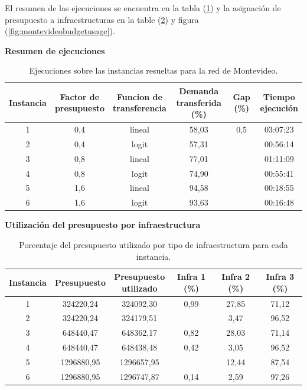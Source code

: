 \documentclass{article}
\begin{document}
  El resumen de las ejecuciones se encuentra en la tabla (\ref{table:montevideoexecutions}) y la asignación de presupuesto a infraestructuras en la table (\ref{table:montevideobudgetusage}) y figura (\ref{fig:montevideobudgetusage}).

  \begin{table}[h!]
    \centering
    \caption*{{\bf Resumen de ejecuciones}}
    \begin{tabular}{cccccc}
      \toprule
        Instancia & \shortstack{Factor de \\ presupuesto} & \shortstack{Funcion de \\ transferencia} & \shortstack{Demanda \\ transferida (\%)} & Gap (\%) & \shortstack{Tiempo \\ ejecución} \\
      \midrule
        1 & 0,4 & lineal & 58,03 & 0,5 & 03:07:23 \\
        2 & 0,4 & logit & 57,31 &  & 00:56:14 \\
        3 & 0,8 & lineal & 77,01 &  & 01:11:09 \\
        4 & 0,8 & logit & 74,90 &  & 00:55:41 \\
        5 & 1,6 & lineal & 94,58 &  & 00:18:55 \\
        6 & 1,6 & logit & 93,63 &  & 00:16:48 \\
      \bottomrule
    \end{tabular}
      \caption{Ejecuciones sobre las instancias resueltas para la red de Montevideo.}\label{table:montevideoexecutions}
  \end{table}

  \begin{table}[h!]
    \centering
    \caption*{{\bf Utilización del presupuesto por infraestructura}}
    \begin{tabular}{cccccc}
      \toprule
        Instancia & Presupuesto & \shortstack{Presupuesto \\ utilizado} & Infra 1 (\%) & Infra 2 (\%) & Infra 3 (\%) \\
      \midrule
        1 & 324220,24 & 324092,30 & 0,99 & 27,85 & 71,12 \\
        2 & 324220,24 & 324179,51 &  & 3,47 & 96,52 \\
        3 & 648440,47 & 648362,17 & 0,82 & 28,03 & 71,14 \\
        4 & 648440,47 & 648438,48 & 0,42 & 3,05 & 96,52 \\
        5 & 1296880,95 & 1296657,95 &  & 12,44 & 87,54 \\
        6 & 1296880,95 & 1296747,87 & 0,14 & 2,59 & 97,26 \\
      \bottomrule
    \end{tabular}
      \caption{Porcentaje del presupuesto utilizado por tipo de infraestructura para cada instancia.}\label{table:montevideobudgetusage}
  \end{table}
\end{document}
